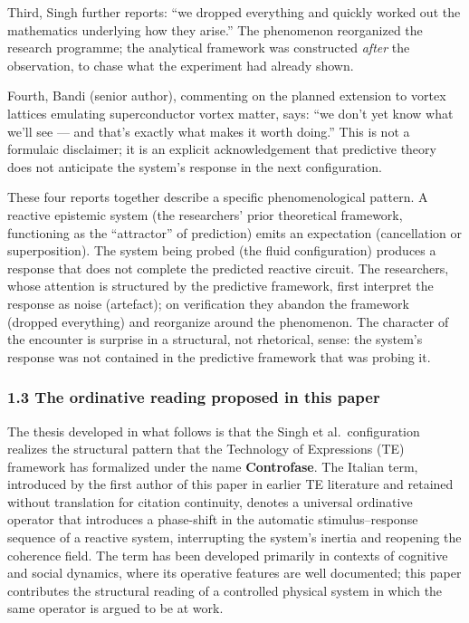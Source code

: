 \documentclass[
  11pt,
  a4paper,
]{article}
\begin{document}
Third, Singh further reports: ``we dropped everything and quickly worked
out the mathematics underlying how they arise.'' The phenomenon
reorganized the research programme; the analytical framework was
constructed \emph{after} the observation, to chase what the experiment
had already shown.

Fourth, Bandi (senior author), commenting on the planned extension to
vortex lattices emulating superconductor vortex matter, says: ``we don't
yet know what we'll see --- and that's exactly what makes it worth
doing.'' This is not a formulaic disclaimer; it is an explicit
acknowledgement that predictive theory does not anticipate the system's
response in the next configuration.

These four reports together describe a specific phenomenological
pattern. A reactive epistemic system (the researchers' prior theoretical
framework, functioning as the ``attractor'' of prediction) emits an
expectation (cancellation or superposition). The system being probed
(the fluid configuration) produces a response that does not complete the
predicted reactive circuit. The researchers, whose attention is
structured by the predictive framework, first interpret the response as
noise (artefact); on verification they abandon the framework (dropped
everything) and reorganize around the phenomenon. The character of the
encounter is surprise in a structural, not rhetorical, sense: the
system's response was not contained in the predictive framework that was
probing it.

\subsubsection{1.3 The ordinative reading proposed in this
paper}\label{the-ordinative-reading-proposed-in-this-paper}

The thesis developed in what follows is that the Singh et
al.~configuration realizes the structural pattern that the Technology of
Expressions (TE) framework has formalized under the name
\textbf{Controfase}. The Italian term, introduced by the first author of
this paper in earlier TE literature and retained without translation for
citation continuity, denotes a universal ordinative operator that
introduces a phase-shift in the automatic stimulus--response sequence of
a reactive system, interrupting the system's inertia and reopening the
coherence field. The term has been developed primarily in contexts of
cognitive and social dynamics, where its operative features are well
documented; this paper contributes the structural reading of a
controlled physical system in which the same operator is argued to be at
work.
\end{document}
